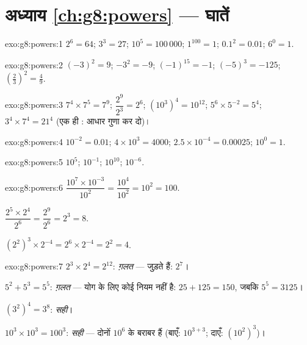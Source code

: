 \section*{अध्याय \ref{ch:g8:powers} --- घातें}

\begin{solution}{exo:g8:powers:1}
$2^6 = 64$; \quad $3^3 = 27$; \quad $10^5 = 100\,000$; \quad
$1^{100} = 1$; \quad $0.1^2 = 0.01$; \quad $6^0 = 1$.
\end{solution}

\begin{solution}{exo:g8:powers:2}
$(-3)^2 = 9$; \quad $-3^2 = -9$; \quad $(-1)^{15} = -1$; \quad
$(-5)^3 = -125$; \quad $\left(\frac23\right)^2 = \frac49$.
\end{solution}

\begin{solution}{exo:g8:powers:3}
$7^4 \times 7^5 = 7^9$; \quad
$\dfrac{2^9}{2^3} = 2^6$; \quad
$\left(10^3\right)^4 = 10^{12}$; \quad
$5^6 \times 5^{-2} = 5^4$; \quad
$3^4 \times 7^4 = 21^4$ (एक ही : आधार गुणा कर दो)।
\end{solution}

\begin{solution}{exo:g8:powers:4}
$10^{-2} = 0.01$; \quad
$4 \times 10^3 = 4000$; \quad
$2.5 \times 10^{-4} = 0.00025$; \quad
$10^0 = 1$.
\end{solution}

\begin{solution}{exo:g8:powers:5}
$10^5$; \quad $10^{-1}$; \quad $10^{10}$; \quad $10^{-6}$.
\end{solution}

\begin{solution}{exo:g8:powers:6}
$\dfrac{10^7 \times 10^{-3}}{10^2} = \dfrac{10^4}{10^2} = 10^2 =
100$.

$\dfrac{2^5 \times 2^4}{2^6} = \dfrac{2^9}{2^6} = 2^3 = 8$.

$\left(2^2\right)^3 \times 2^{-4} = 2^6 \times 2^{-4} = 2^2 = 4$.
\end{solution}

\begin{solution}{exo:g8:powers:7}
$2^3 \times 2^4 = 2^{12}$: \emph{ग़लत} ---  जुड़ते हैं:
$2^7$।

$5^2 + 5^3 = 5^5$: \emph{ग़लत} --- योग के लिए कोई नियम नहीं है:
$25 + 125 = 150$, जबकि $5^5 = 3125$।

$(3^2)^4 = 3^8$: \emph{सही}।

$10^3 \times 10^3 = 100^3$: \emph{सही} --- दोनों $10^6$ के बराबर
हैं (बाएँ: $10^{3+3}$; दाएँ: $(10^2)^3$)।
\end{solution}

